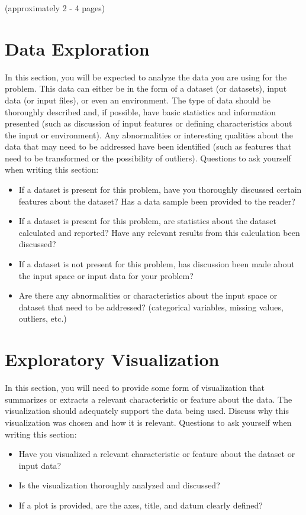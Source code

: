 \documentclass[twoside,openright,titlepage,numbers=noenddot,headinclude,%
               footinclude=true,cleardoublepage=empty,abstractoff,BCOR=5mm,%
               paper=a4,fontsize=11pt,ngerman,american]{scrreprt}
\numberwithin{theorem}{chapter}
\numberwithin{definition}{chapter}
\numberwithin{algorithm}{chapter}
\numberwithin{figure}{chapter}
\numberwithin{table}{chapter}
\numberwithin{equation}{chapter}
\begin{document}
(approximately 2 - 4 pages)
\section*{Data Exploration}

In this section, you will be expected to analyze the data you are using for the problem. This data can either be in the form of a dataset (or datasets), input data (or input files), or even an environment. The type of data should be thoroughly described and, if possible, have basic statistics and information presented (such as discussion of input features or defining characteristics about the input or environment). Any abnormalities or interesting qualities about the data that may need to be addressed have been identified (such as features that need to be transformed or the possibility of outliers). Questions to ask yourself when writing this section:

\begin{itemize}%
\item If a dataset is present for this problem, have you thoroughly discussed certain features about the dataset? Has a data sample been provided to the reader?
\item If a dataset is present for this problem, are statistics about the dataset calculated and reported? Have any relevant results from this calculation been discussed?
\item If a dataset is not present for this problem, has discussion been made about the input space or input data for your problem?
\item Are there any abnormalities or characteristics about the input space or dataset that need to be addressed? (categorical variables, missing values, outliers, etc.)
\end{itemize}

\section*{Exploratory Visualization}

In this section, you will need to provide some form of visualization that summarizes or extracts a relevant characteristic or feature about the data. The visualization should adequately support the data being used. Discuss why this visualization was chosen and how it is relevant. Questions to ask yourself when writing this section:
\begin{itemize}%
\item Have you visualized a relevant characteristic or feature about the dataset or input data?
\item Is the visualization thoroughly analyzed and discussed?
\item If a plot is provided, are the axes, title, and datum clearly defined?
\end{itemize}
\end{document}
